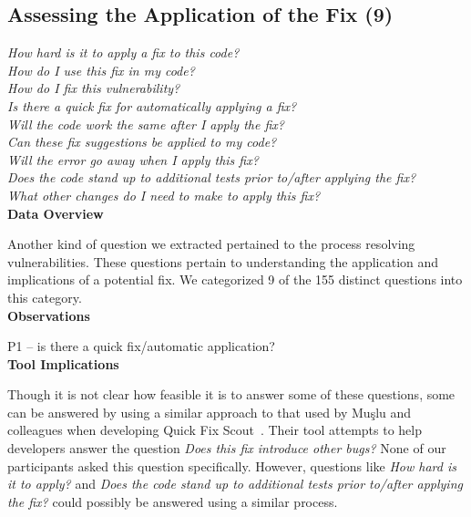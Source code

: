 \documentclass[conference]{IEEEtran}
\begin{document}

\noindent\subsection{\textbf{Assessing the Application of the Fix (9)}}\label{aaf}

\noindent\emph{How hard is it to apply a fix to this code?} \\
\emph{How do I use this fix in my code?} \\
\emph{How do I fix this vulnerability?} \\
\emph{Is there a quick fix for automatically applying a fix?} \\
\emph{Will the code work the same after I apply the fix?} \\
\emph{Can these fix suggestions be applied to my code?} \\
\emph{Will the error go away when I apply this fix?} \\
\emph{Does the code stand up to additional tests prior to/after applying the fix?} \\
\emph{What other changes do I need to make to apply this fix?} \\


\noindent\textbf{Data Overview}

Another kind of question we extracted pertained to the process resolving vulnerabilities. 
These questions pertain to understanding the application and implications of a potential fix. 
We categorized 9 of the 155 distinct questions into this category.
\\

\noindent\textbf{Observations}

P1 -- is there a quick fix/automatic application?
\\

\noindent\textbf{Tool Implications}

Though it is not clear how feasible it is to answer some of these questions, some can be answered by using a similar approach to that used by Mu{\c{s}}lu and colleagues when developing Quick Fix Scout~\cite{mucslu2012speculative}. 
Their tool attempts to help developers answer the question \textit{Does this fix introduce other bugs?} None of our participants asked this question specifically. 
However, questions like \textit{How hard is it to apply?} and \textit{Does the code stand up to additional tests prior to/after applying the fix?} could possibly be answered using a similar process.
\end{document}
